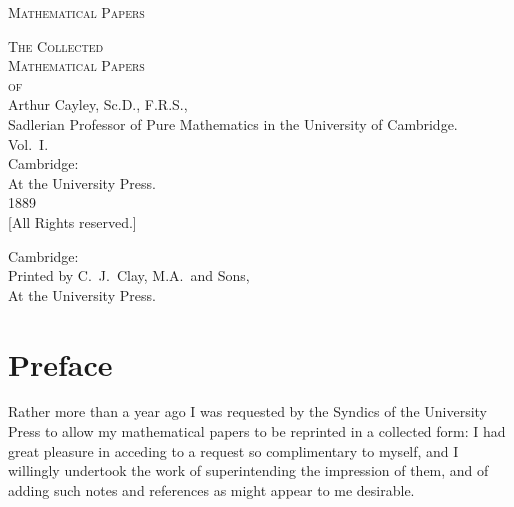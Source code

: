 \documentclass[11pt,a4paper]{book}
\theoremstyle{plain}
\theoremstyle{definition}
\theoremstyle{remark}
\begin{document}
\frontmatter

\thispagestyle{empty}
\begin{center}
\vspace*{2in}
{\Large\scshape Mathematical Papers}
\end{center}
\cleardoublepage

\thispagestyle{empty}
\begin{center}
\vspace*{1.5in}
{\Huge\scshape The Collected\\[0.3em] Mathematical Papers}\\[1.5em]
{\Large\scshape of}\\[1.5em]
{\LARGE Arthur Cayley, Sc.D., F.R.S.,}\\[0.5em]
{\small Sadlerian Professor of Pure Mathematics in the University of Cambridge.}\\[2em]
{\Large Vol.\ I.}\\[2em]
\vfill
{\large Cambridge:}\\
{\normalsize At the University Press.}\\[0.5em]
{\small 1889}\\[0.5em]
{\scriptsize [All Rights reserved.]}
\end{center}
\cleardoublepage

\thispagestyle{empty}
\begin{center}
\vspace*{3in}
{\small Cambridge:}\\
{\small Printed by C.\ J.\ Clay, M.A.\ and Sons,}\\
{\small At the University Press.}
\end{center}
\cleardoublepage

\chapter*{Preface}

Rather more than a year ago I was requested by the Syndics of the University Press to allow my mathematical papers to be reprinted in a collected form: I had great pleasure in acceding to a request so complimentary to myself, and I willingly undertook the work of superintending the impression of them, and of adding such notes and references as might appear to me desirable.
\end{document}
